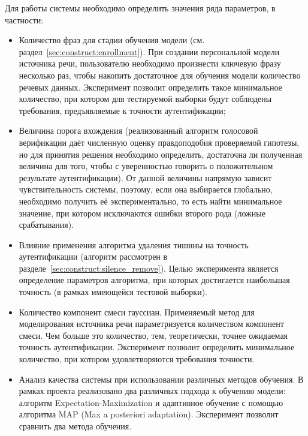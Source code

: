 Для работы системы необходимо определить значения ряда параметров, в частности:

\begin{itemize}

\item Количество фраз для стадии обучения модели (см.
раздел~\ref{sec:construct:enrollment}). При создании персональной модели
источника речи, пользователю необходимо произнести ключевую фразу несколько раз,
чтобы накопить достаточное для обучения модели количество речевых данных.
Эксперимент позволит определить такое минимальное количество, при котором для
тестируемой выборки будут соблюдены требования, предъявляемые к точности
аутентификации;

\item Величина порога вхождения (реализованный алгоритм голосовой верификации даёт
численную оценку правдоподобия проверяемой гипотезы, но для принятия решения
необходимо определить, достаточна ли полученная величина для того, чтобы с
уверенностью говорить о положительном результате аутентификации). От данной
величины напрямую зависит чувствительность системы, поэтому, если она выбирается
глобально, необходимо получить её экспериментально, то есть найти минимальное
значение, при котором исключаются ошибки второго рода (ложные срабатывания).

\item Влияние применения алгоритма удаления тишины на точность аутентификации (алгоритм
рассмотрен в разделе~\ref{sec:construct:silence_remove}). Целью эксперимента
является определение параметров алгоритма, при которых достигается наибольшая
точность (в рамках имеющейся тестовой выборки).

\item Количество компонент смеси гауссиан. Применяемый метод для моделирования
источника речи параметризуется количеством компонент смеси. Чем больше это
количество, тем, теоретически, точнее ожидаемая точность аутентификации.
Эксперимент позволит определить минимальное количество, при котором
удовлетворяются требования точности.

\item Анализ качества системы при использовании различных методов обучения. В
рамках проекта реализовано два различных подхода к обучению модели: алгоритм
Expectation-Maximization и адаптивное обучение с помощью алгоритма MAP (Max a
posteriori adaptation). Эксперимент позволит сравнить два метода обучения.

\end{itemize}

